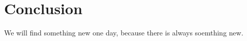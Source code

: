 \chapter{Conclusion}
\label{conclusion}

We will find something new one day, because there is always soemthing new.
